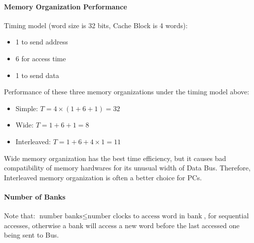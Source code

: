 \documentclass[12pt, a4paper]{article}
\theoremstyle{margin}
\begin{document}
			\paragraph{Memory Organization Performance}
				Timing model (word size is 32 bits, Cache Block is 4 words):
				\begin{itemize}
					\item 1 to send address
					\item 6 for access time
					\item 1 to send data
				\end{itemize}
				Performance of these three memory organizations under the timing model above:
				\begin{itemize}
					\item Simple: $T=4\times(1+6+1)=32$
					\item Wide: $T=1+6+1=8$
					\item Interleaved: $T=1+6+4\times1=11$
				\end{itemize}
				Wide memory organization has the best time efficiency, but it causes bad compatibility of memory hardwares for its unusual width of Data Bus. Therefore, Interleaved memory organization is often a better choice for PCs.

				\paragraph{Number of Banks} Note that: $\text{number banks} \le \text{number clocks to access word in bank}$, for sequential accesses, otherwise a bank will access a new word before the last accessed one being sent to Bus.
\end{document}
